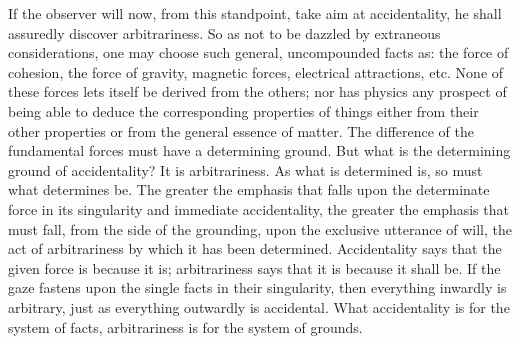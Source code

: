 \documentclass[12pt,a4paper]{book}
\begin{document}
If the observer will now, from this standpoint, take aim at accidentality, he shall
assuredly discover arbitrariness. So as not to be dazzled by extraneous considerations,
one may choose such general, uncompounded facts as: the force of cohesion, the force of
gravity, magnetic forces, electrical attractions, etc. None of these forces lets itself be
derived from the others; nor has physics any prospect of being able to deduce the
corresponding properties of things either from their other properties or from the general
essence of matter. The difference of the fundamental forces must have a determining
ground. But what is the determining ground of accidentality? It is arbitrariness. As what
is
determined is, so must what determines be. The greater the emphasis that falls upon the
determinate force in its singularity and immediate accidentality, the greater the emphasis
that must fall, from the side of the grounding, upon the exclusive utterance of will, the
act of arbitrariness by which it has been determined. Accidentality says that the given
force is because it is; arbitrariness says that it is because it shall be. If the gaze
fastens upon the single facts in their singularity, then everything inwardly is arbitrary,
just as everything outwardly is accidental. What accidentality is for the system of facts,
arbitrariness is for the system of grounds.
\end{document}
